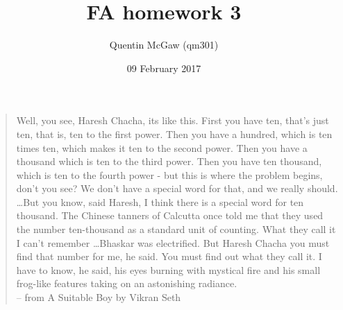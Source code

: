 \documentclass{article}
\title{FA homework 3}
\author{Quentin McGaw (qm301)}
\date{09 February 2017}
\begin{document}
\maketitle

\begin{quote}
Well, you see, Haresh Chacha, its like this.  First you have ten, that's
just ten, that is, ten to the first power.  Then you have a hundred, which
is ten times ten, which makes it ten to the second power.  Then you have a
thousand which is ten to the third power.  Then you have ten thousand,
which is ten to the fourth power - but this is where the problem begins,
don't you see?  We don't have a special word for that, and we really
should. \ldots  But you know, said Haresh, I think there is a special
word for ten thousand.  The Chinese tanners of Calcutta once told me that
they used the number ten-thousand as a standard unit of counting.  What
they call it I can't remember \ldots  Bhaskar was electrified.  But Haresh
Chacha you must find that number for me, he said.  You must find out what
they call it.  I have to know, he said, his eyes burning with mystical fire
and his small frog-like features taking on an astonishing radiance.
\\ -- from A Suitable Boy by Vikran Seth
\end{quote}
\end{document}
